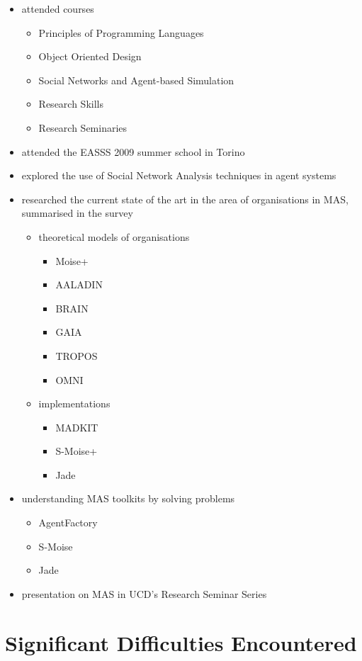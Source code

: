 \documentclass{article}
\begin{document}
\begin{itemize}
\item attended courses
  \begin{itemize}
  \item Principles of Programming Languages
  \item Object Oriented Design
  \item Social Networks and Agent-based Simulation
  \item Research Skills
  \item Research Seminaries
  \end{itemize}
\item attended the EASSS 2009 summer school in Torino
\item explored the use of Social Network Analysis techniques in agent systems
\item 
  researched the current state of the art in the area of organisations in MAS,
  summarised in the survey
  \begin{itemize}
  \item theoretical models of organisations
    \begin{itemize}
    \item Moise+
    \item AALADIN
    \item BRAIN
    \item GAIA
    \item TROPOS
    \item OMNI
    \end{itemize}
  \item implementations
    \begin{itemize}
    \item MADKIT
    \item S-Moise+
    \item Jade
    \end{itemize}
  \end{itemize}
\item understanding MAS toolkits by solving problems
  \begin{itemize}
  \item AgentFactory
  \item S-Moise
  \item Jade
  \end{itemize}
\item presentation on MAS in UCD's Research Seminar Series
\end{itemize}


\section{Significant Difficulties Encountered}
\end{document}
